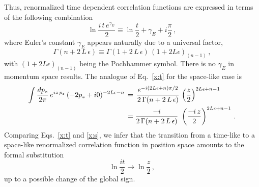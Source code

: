 \documentclass[12pt]{article}
\numberwithin{equation}{section}
\newcommand{\1}[1]{\mathbf{1}^{#1}}
\newcommand{\2}[1]{\mathbf{2}^{#1}}
\newcommand{\3}[1]{\mathbf{3}^{#1}}
\newcommand{\4}[1]{\mathbf{4}^{#1}}
\newcommand{\5}[1]{\mathbf{5}^{#1}}
\newcommand{\ice}[1]{{}}
\newcommand{\EQN}[1]{\hspace{3mm}\fbox{\fbox{$#1$}} \label{#1}}
\newcommand{\mlabel}[1]{ \text{\footnotesize \hspace{3mm}\fbox{\fbox{$#1$}} \label{#1}}}
\renewcommand{\EQN}[1]{\mlabel{#1}}
\renewcommand{\mlabel}[1]{\label{#1}}
\renewcommand{\EQN}[1]{\label{#1}}
\newcommand{\nnb}{\nonumber}
\newcommand{\ep}{\epsilon}
\newcommand{\beq}{\begin{equation}}
\newcommand{\eeq}{\end{equation}}
\newcommand{\eqs}[1]{\begin{align}#1\end{align}}
\newcommand{\re}[1]{(\ref{#1})}
\newcommand{\ga}{\gamma}
\newcommand{\Ga}{\Gamma}
\newcommand{\vv}{v^2}
\begin{document}
Thus, renormalized time dependent correlation functions are expressed in terms of 
the following combination
\beq
\ln\frac{i\,t\, e^{\ga_E}}{2} \equiv \ln\frac{t}{2} + \ga_E +  i\frac{\pi}{2}
\EQN{comb1}
\,, 
\eeq
where Euler's constant $\gamma_E$  appears  naturally 
due to a universal factor,
\beq
\Ga(n  + 2\, L\,\ep) \equiv \Ga(1  + 2\, L\,\ep)\, \left(1+2 L \ep\right)_{(n-1)} \,,
\eeq
with $\left(1+2 L \ep\right)_{(n-1)}$ being the Pochhammer symbol. 
There is no $\ga_E$ in momentum space results.
The analogue of Eq.~\eqref{x:t} for the space-like case is
\eqs{
\int \frac{d p_z }{2\pi}\, e^{i z\, p_z } \, (-2 p_z  + i0)^{-2 L \ep -n}
\, &=\,
\frac{e^{-i (2 L\ep +n) \pi/2}}{2\,\Ga(n + 2\, L\,\ep)}\,\,\Bigl(\frac{z}{2}\Bigr) ^{2 L \ep +n-1}
\nnb
\\
&=
\frac{-i}{2\,\Ga(n + 2\, L\,\ep)}\,\,\left(\frac{-i\,z}{2}\right)^{2 L \ep +n -1}
\,.
\EQN{x:s}
}
Comparing Eqs.~\eqref{x:t} and \eqref{x:s}, we infer that the transition from a
time-like to a space-like renormalized correlation function in position space amounts to the
formal substitution
\beq
\ln\frac{it}{2} \to \ln\frac{z}{2}\,,
\mlabel{sub}
\eeq
up to a possible change of the global sign.
\ice{
\section{Temporary: One-loop results}
For clarity repeat definitions from \eqref{<O(z)>} and \eqref{Pi(omega)}: 
\begin{align}
  \langle 0|v^\mu O_\mu(z) |0\rangle &=  \langle 0| \bar q(zv)\slashed{v}[zv,0] q(0)|0\rangle\,,   
\notag\\
  \Pi(\omega) & =  i\int\!d^D x \, e^{ip\cdot x} \langle 0| \text{T}\,\{j(x) \slashed{v} j^\dagger (0)\}  
\end{align}
I get for position-space: 
\begin{align}
   \langle 0|v^\mu O_\mu(z) |0\rangle &=  \frac{2iN_c}{\pi^2 \vv\, z^3} 
\end{align}
Momentum space $\vv =1$:
\begin{align}
  \Pi(\omega) & =  \frac{N_c}{2\pi^2} \omega^2
\Big\{\frac{1}{\epsilon} -\gamma_E + \ln 4\pi  -2 \ln (-2\omega/\mu) + 2 \Big\}
\end{align}
Momentum space $\vv =-1 $:
\begin{align}
  \Pi(\omega) & =  - \frac{N_c}{2\pi^2} \omega^2
\Big\{\frac{1}{\epsilon} -\gamma_E + \ln 4\pi  -2 \ln (2\omega/\mu) + 2 + i\pi \Big\}
\end{align}
I think the sign change is due to the kinematic factor $v^2$; Defining $v$-dimension as the sum of powers of 
heavy lines we did not take into account that explicit $v$-factors can be present. 
%
% 
}
\end{document}
